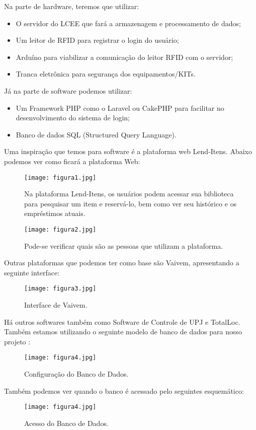 \vspace{-42pt}
Na parte de hardware, teremos que utilizar:
\begin{itemize}
   \item O servidor do LCEE que fará a armazenagem e processamento de dados; 
   \item Um leitor de RFID para registrar o login do usuário;
   \item Arduíno para viabilizar a comunicação do leitor RFID com o servidor;
   \item Tranca eletrônica para segurança dos equipamentos/KITs.
\end{itemize}
Já na parte de software podemos utilizar:
\begin{itemize}
   \item Um Framework PHP como o Laravel ou CakePHP para facilitar no desenvolvimento do sistema de login; 
   \item Banco de dados SQL (Structured Query Language).
\end{itemize}

Uma inspiração que temos para software é a plataforma web Lend-Itens. Abaixo podemos ver como ficará a plataforma Web:

\begin{figure}[!h]
	\centering
	\caption{Na plataforma Lend-Itens, os usuários podem acessar sua biblioteca para pesquisar um item e reservá-lo, bem como ver seu histórico e os empréstimos atuais.}
	\texttt{[image: figura1.jpg]}
	\label{fig:label_da_figura}
\end{figure}


\begin{figure}[!h]
	\centering
	\caption{Pode-se verificar quais são as pessoas que utilizam a plataforma.}
	\texttt{[image: figura2.jpg]}
	\label{fig:label_da_figura}
\end{figure}

Outras plataformas que podemos ter como base são Vaivem, apresentando a seguinte interface:

\begin{figure}[!h]
	\centering
	\caption{Interface de Vaivem.}
	\texttt{[image: figura3.jpg]}
	\label{fig:label_da_figura}
\end{figure}


Há outros softwares também como Software de Controle de UPJ e TotalLoc.
Também estamos utilizando o seguinte modelo de banco de dados para nosso projeto :
\begin{figure}[!h]
	\centering
	\caption{Configuração do Banco de Dados.}
	\texttt{[image: figura4.jpg]}
	\label{fig:label_da_figura}
\end{figure}


Também podemos ver quando o banco é acessado pelo seguintes esquemático:

\begin{figure}[!h]
	\centering
	\caption{Acesso do Banco de Dados.}
	\texttt{[image: figura4.jpg]}
	\label{fig:label_da_figura}
\end{figure}
